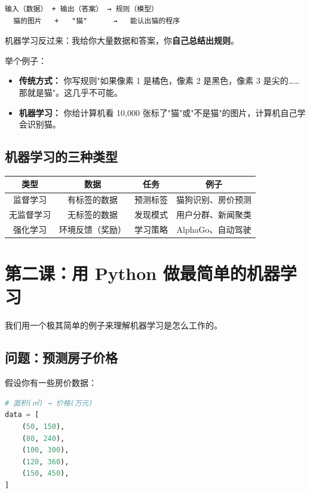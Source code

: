 \documentclass[a4paper,12pt]{ctexart}
\begin{document}
\begin{verbatim}
输入（数据） + 输出（答案） → 规则（模型）
  猫的图片   +   "猫"      →   能认出猫的程序
\end{verbatim}

机器学习反过来：我给你大量数据和答案，你\textbf{自己总结出规则}。

举个例子：
\begin{itemize}
  \item \textbf{传统方式：} 你写规则"如果像素 1 是橘色，像素 2 是黑色，像素 3 是尖的……那就是猫"。这几乎不可能。
  \item \textbf{机器学习：} 你给计算机看 10,000 张标了"猫"或"不是猫"的图片，计算机自己学会识别猫。
\end{itemize}

\subsection*{机器学习的三种类型}

\begin{center}
\begin{tabular}{|c|c|c|c|}
\hline
\textbf{类型} & \textbf{数据} & \textbf{任务} & \textbf{例子} \\ \hline
监督学习 & 有标签的数据 & 预测标签 & 猫狗识别、房价预测 \\ \hline
无监督学习 & 无标签的数据 & 发现模式 & 用户分群、新闻聚类 \\ \hline
强化学习 & 环境反馈（奖励） & 学习策略 & AlphaGo、自动驾驶 \\ \hline
\end{tabular}
\end{center}

\section*{第二课：用 Python 做最简单的机器学习}

我们用一个极其简单的例子来理解机器学习是怎么工作的。

\subsection*{问题：预测房子价格}

假设你有一些房价数据：

\begin{lstlisting}[language=Python]
# 面积(㎡) → 价格(万元)
data = [
    (50, 150),
    (80, 240),
    (100, 300),
    (120, 360),
    (150, 450),
]
\end{lstlisting}
\end{document}
